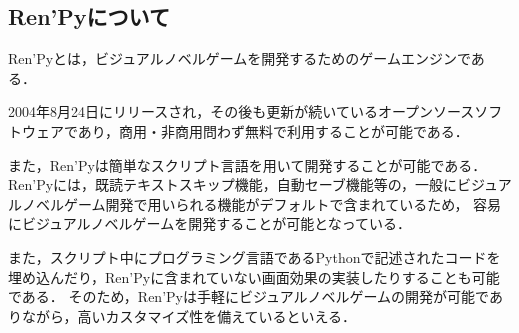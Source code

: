 \subsection{Ren'Pyについて}

Ren'Pyとは，ビジュアルノベルゲームを開発するためのゲームエンジンである．
    
2004年8月24日にリリースされ，その後も更新が続いているオープンソースソフトウェアであり，商用・非商用問わず無料で利用することが可能である．

また，Ren'Pyは簡単なスクリプト言語を用いて開発することが可能である．
Ren'Pyには，既読テキストスキップ機能，自動セーブ機能等の，一般にビジュアルノベルゲーム開発で用いられる機能がデフォルトで含まれているため，
容易にビジュアルノベルゲームを開発することが可能となっている．

また，スクリプト中にプログラミング言語であるPythonで記述されたコードを埋め込んだり，Ren'Pyに含まれていない画面効果の実装したりすることも可能である．
そのため，Ren'Pyは手軽にビジュアルノベルゲームの開発が可能でありながら，高いカスタマイズ性を備えているといえる．
